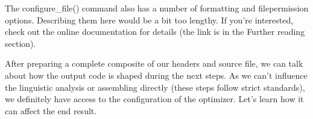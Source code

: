 The configure\_file() command also has a number of formatting and filepermission options. Describing them here would be a bit too lengthy. If you're interested, check out the online documentation for details (the link is in the Further reading section).

After preparing a complete composite of our headers and source file, we can talk about how the output code is shaped during the next steps. As we can't influence the linguistic analysis or assembling directly (these steps follow strict standards), we definitely have access to the configuration of the optimizer. Let's learn how it can affect the end result.


























